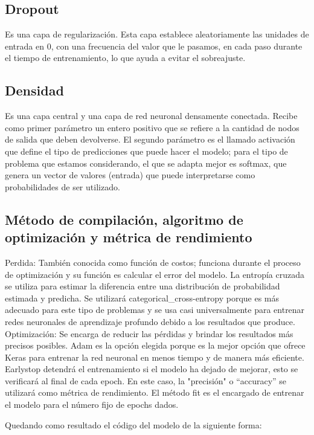 \documentclass[12pt, a4paper, titlepage]{article}
\begin{document}
	\subsection{Dropout}
	Es una capa de regularización. Esta capa establece aleatoriamente las unidades de entrada en 0, con una frecuencia del valor que le pasamos, en cada paso durante el tiempo de entrenamiento, lo que ayuda a evitar el sobreajuste.
	\begin{center}
		
	\end{center}
	\subsection{Densidad}
	Es una capa central y una capa de red neuronal densamente conectada. Recibe como primer parámetro un entero positivo que se refiere a la cantidad de nodos de salida que deben devolverse. El segundo parámetro es el llamado activación que define el tipo de predicciones que puede hacer el modelo; para el tipo de problema que estamos considerando, el que se adapta mejor es softmax, que genera un vector de valores (entrada) que puede interpretarse como probabilidades de ser utilizado.
	\begin{center}
		
	\end{center}
	\subsection{Método de compilación, algoritmo de optimización y métrica de rendimiento}
	Perdida: También conocida como función de costos; funciona durante el proceso de optimización y su función es calcular el error del modelo. La entropía cruzada se utiliza para estimar la diferencia entre una distribución de probabilidad estimada y predicha. Se utilizará categorical\_cross-entropy porque es más adecuado para este tipo de problemas y se usa casi universalmente para entrenar redes neuronales de aprendizaje profundo debido a los resultados que produce.
	Optimización: Se encarga de reducir las pérdidas y brindar los resultados más precisos posibles. Adam es la opción elegida porque es la mejor opción que ofrece Keras para entrenar la red neuronal en menos tiempo y de manera más eficiente. Earlystop detendrá el entrenamiento si el modelo ha dejado de mejorar, esto se verificará al final de cada epoch. En este caso, la "precisión" o “accuracy” se utilizará como métrica de rendimiento.
	El método fit es el encargado de entrenar el modelo para el número fijo de epochs dados.	
	\begin{center}
		
	\end{center}
	Quedando como resultado el código del modelo de la siguiente forma:
	\begin{center}
		
	\end{center}
\end{document}
